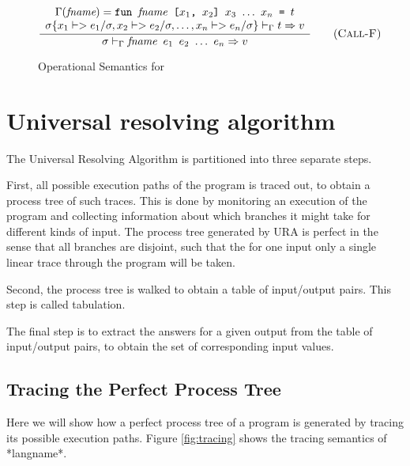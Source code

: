 \documentclass[10pt]{../sigplanconf}
\newcommand{\nfrac}[2]{\frac{\displaystyle{#1}}{\displaystyle{#2}}}
\newcommand{\tagsc}[1]{\tag{\scshape #1}}
\begin{document}
\begin{figure}
\begin{equation}
  \nfrac{
    \begin{array}{c}
      \Gamma(\textit{fname}) =
        \texttt{fun \textit{\rmfamily fname} [$x_1$, $x_2$] $x_3$ $\ldots$ $x_n$ = $t$}
        \\
      \sigma\{x_1 |-> e_1/\sigma, x_2 |-> e_2/\sigma, \ldots, x_n |-> e_n/\sigma\} |-_\Gamma t => v
    \end{array}
  }{
    \sigma |-_\Gamma \texttt{\textit{\rmfamily fname} $e_1$ $e_2$ $\ldots$ $e_n$} => v
  } \tagsc{Call-F}
\end{equation}


\caption{Operational Semantics for }
\label{fig:semantics}
\end{figure}


\section{Universal resolving algorithm}
The Universal Resolving Algorithm is partitioned into three separate
steps.

First, all possible execution paths of the program is traced out, to
obtain a process tree of such traces. This is done by monitoring an
execution of the program and collecting information about which
branches it might take for different kinds of input. The process tree
generated by URA is perfect in the sense that all branches are
disjoint, such that the for one input only a single linear trace
through the program will be taken.

Second, the process tree is walked to obtain a table of input/output
pairs. This step is called tabulation.

The final step is to extract the answers for a given output from the
table of input/output pairs, to obtain the set of corresponding input
values.


\subsection{Tracing the Perfect Process Tree}
Here we will show how a perfect process tree of a program is generated
by tracing its possible execution paths. Figure \ref{fig:tracing}
shows the tracing semantics of *langname*.
\end{document}
